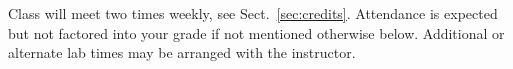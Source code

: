 Class will meet two times weekly, see Sect.~\ref{sec:credits}. Attendance is expected but not factored into your grade if not mentioned otherwise below. Additional or alternate lab times may be arranged with the instructor.